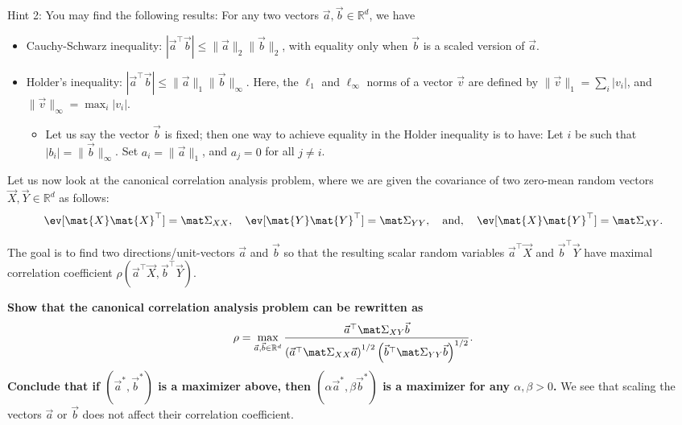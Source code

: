 \documentclass[preview]{standalone}
\begin{document}
\begin{Parts}
Hint 2: You may find the following results:
For any two vectors $\vec{a}, \vec{b} \in \mathbb{R}^d$, we have
\begin{itemize}
  \item Cauchy-Schwarz inequality: $|\vec{a}^\top \vec{b}| \leq \|\vec{a}\|_2 \|\vec{b}\|_2$,
with equality only when $\vec{b}$ is a scaled version of $\vec{a}$.
  \item Holder's inequality: $|\vec{a}^\top \vec{b}| \leq \| \vec{a}\|_1 \|\vec{b}\|_\infty$.
  Here, the $\ell_1$ and $\ell_\infty$ norms of a vector $\vec v$ are defined by
  $\|\vec{v}\|_1 = \sum_i |v_i|$, and $\|\vec{v}\|_\infty = \max_i |v_i|$.
  \begin{itemize}
    \item Let us say the vector $\vec{b}$ is fixed; then one way to achieve equality in the Holder
inequality is to have:
Let $i$ be such that $|b_i| = \|\vec{b}\|_\infty$.
Set $a_i = \|\vec{a}\|_1$, and $a_j = 0$ for all $j \neq i$.
\end{itemize}
\end{itemize}




\Part

Let us now look at the canonical correlation analysis problem, where we are given
the covariance of two zero-mean random vectors $\vec X, \vec Y \in \mathbb{R}^d$
as follows:
\begin{align*}
\ev [\mat{X}\mat{X}^\top] = \mat \Sigma_{XX}, \quad
\ev [\mat{Y}\mat{Y}^\top] = \mat \Sigma_{YY}, \quad \text{and},\quad
\ev [\mat{X}\mat{Y}^\top] = \mat \Sigma_{XY}.
\end{align*}

The goal is to find two directions/unit-vectors $\vec a $ and $\vec b$ so that the
resulting scalar random variables $\vec{a}^{\top} \vec X$ and
$\vec{b}^{\top} \vec Y$ have maximal correlation coefficient
$\rho(\vec{a}^{\top} \vec X, \vec{b}^{\top} \vec Y)$.

{\bf Show that the canonical correlation analysis problem can be rewritten as
\begin{align*}
\rho = \max_{\vec{a}, \vec{b} \in \mathbb{R}^d} \frac{\vec{a}^\top \mat \Sigma_{XY} \vec{b}}
{ \left( \vec{a}^\top \mat \Sigma_{XX} \vec{a}\right)^{1/2} \left( \vec{b}^\top \mat \Sigma_{YY} \vec{b}\right)^{1/2} }.
\end{align*}
Conclude that if $(\vec{a}^*, \vec{b}^*)$ is a maximizer above,
then $(\alpha \vec{a}^*, \beta \vec{b}^*)$ is a maximizer for any $\alpha, \beta > 0$.}
We see that scaling the vectors $\vec a$ or $\vec b$ does not affect their correlation coefficient.




\end{Parts}
\end{document}
